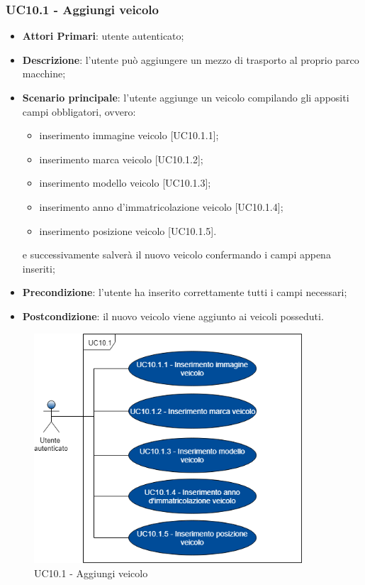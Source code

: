  \subsubsection{UC10.1 - Aggiungi veicolo}
 \begin{itemize}
 	\item \textbf{Attori Primari}: utente autenticato;
 	\item \textbf{Descrizione}: l'utente può aggiungere un mezzo di trasporto al proprio parco macchine;
 	\item \textbf{Scenario principale}: l'utente aggiunge un veicolo compilando gli appositi campi obbligatori, ovvero:
 	\begin{itemize}
 		\item inserimento immagine veicolo [UC10.1.1];
 		\item inserimento marca veicolo [UC10.1.2];
 		\item inserimento modello veicolo [UC10.1.3];
 		\item inserimento anno d'immatricolazione veicolo [UC10.1.4];
 		\item inserimento posizione veicolo [UC10.1.5].
 	\end{itemize}
 	e successivamente salverà il nuovo veicolo confermando i campi appena inseriti;
 	\item \textbf{Precondizione}: l'utente ha inserito correttamente tutti i campi necessari;
 	\item \textbf{Postcondizione}: il nuovo veicolo viene aggiunto ai veicoli posseduti.
 \end{itemize}
\begin{figure}[H]
	\includegraphics[width=10cm]{res/images/UC10-1Aggiungiveicolo.png}
	\centering
	\caption{UC10.1 - Aggiungi veicolo}
\end{figure}
